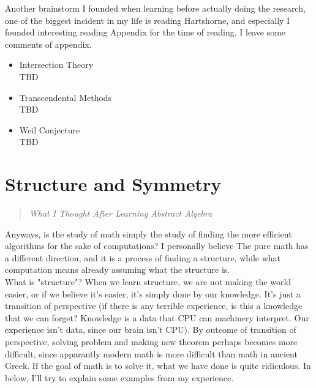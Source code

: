 \documentclass{article}
\begin{document}
Another brainstorm I founded when learning before actually doing the research, 
one of the biggest incident in my life is reading Hartshorne, and especially I founded interesting reading Appendix for the time of reading. 
I leave some comments of appendix. \\

\begin{itemize}
\item Intersection Theory \\ 
TBD
\item Transcendental Methods \\
TBD
\item Weil Conjecture \\
TBD
\end{itemize}





\section {Structure and Symmetry}
\begin{quote}
\textit{What I Thought After Learning Abstract Algebra}
\end{quote}

Anyways, is the study of math simply the study of finding the more efficient algorithms for the sake of computations?
I personally believe The pure math has a different direction, and it is a process of finding a structure,
while what computation means already assuming what the structure is.   \\

What is "structure"? When we learn structure, we are not making the world easier,
or if we believe it's easier, it's simply done by our knowledge. It's just a transition of perspective
(if there is any terrible experience, is this a knowledge that we can forget?
Knowledge is a data that CPU can machinery interpret. Our experience isn't data, since our brain isn't CPU).
By outcome of transition of perspective, solving problem and making new theorem perhaps becomes more difficult, 
since apparantly modern math is more difficult than math in ancient Greek.
If the goal of math is to solve it, what we have done is quite ridiculous. 
In below, I'll try to explain some examples from my experience. \\
\end{document}
